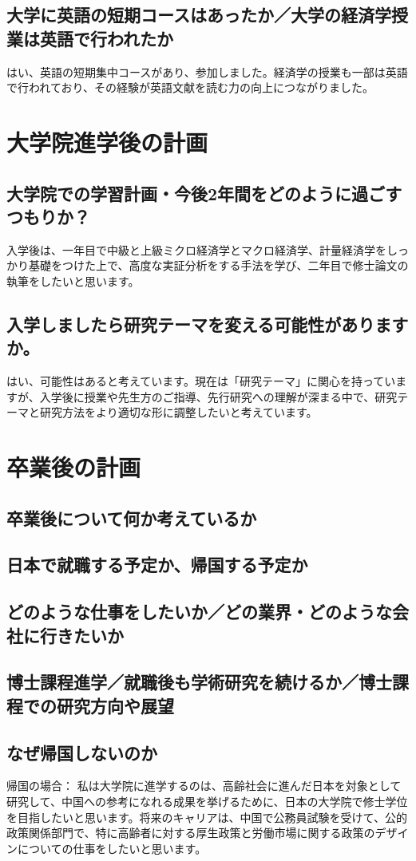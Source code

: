 \documentclass[xelatex,a4paper,base=11pt,ja=standard,jafont=noto]{bxjsreport}
\begin{document}
\section{大学に英語の短期コースはあったか／大学の経済学授業は英語で行われたか}
はい、英語の短期集中コースがあり、参加しました。経済学の授業も一部は英語で行われており、その経験が英語文献を読む力の向上につながりました。
\chapter{大学院進学後の計画}
\section{大学院での学習計画・今後2年間をどのように過ごすつもりか？}
⼊学後は、⼀年⽬で中級と上級ミクロ経済学とマクロ経済学、計量経済学をしっかり基礎をつけた上で、⾼度な実証分析をする⼿法を学び、⼆年⽬で修⼠論⽂の執筆をしたいと思います。
\section{入学しましたら研究テーマを変える可能性がありますか。}
はい、可能性はあると考えています。現在は「研究テーマ」に関心を持っていますが、入学後に授業や先生方のご指導、先行研究への理解が深まる中で、研究テーマと研究方法をより適切な形に調整したいと考えています。
\chapter{卒業後の計画}
\section{卒業後について何か考えているか}
\section{日本で就職する予定か、帰国する予定か}
\section{どのような仕事をしたいか／どの業界・どのような会社に行きたいか}
\section{博士課程進学／就職後も学術研究を続けるか／博士課程での研究方向や展望}
\section{なぜ帰国しないのか}
帰国の場合：
私は⼤学院に進学するのは、⾼齢社会に進んだ⽇本を対象として研究して、中国への参考になれる成果を挙げるために、⽇本の⼤学院で修⼠学位を⽬指したいと思います。将来のキャリアは、中国で公務員試験を受けて、公的政策関係部⾨で、特に⾼齢者に対する厚⽣政策と労働市場に関する政策のデザインについての仕事をしたいと思います。
\end{document}
